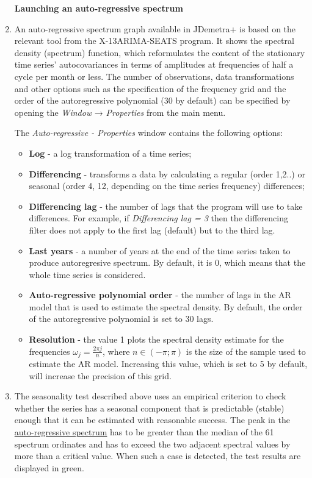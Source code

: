\documentclass[
  letterpaper,
  DIV=11,
  numbers=noendperiod]{scrreprt}
\begin{document}
\begin{enumerate}
\begin{figure}
  \end{figure}

  \textbf{Launching an auto-regressive spectrum}
\item
  An auto-regressive spectrum graph available in JDemetra+ is based on
  the relevant tool from the X-13ARIMA-SEATS program. It shows the
  spectral density (spectrum) function, which reformulates the content
  of the stationary time series' autocovariances in terms of amplitudes
  at frequencies of half a cycle per month or less. The number of
  observations, data transformations and other options such as the
  specification of the frequency grid and the order of the
  autoregressive polynomial (30 by default) can be specified by opening
  the \emph{Window} → \emph{Properties} from the main menu.

  The \emph{Auto-regressive - Properties} window contains the following
  options:

  \begin{itemize}
  \item
    \textbf{Log} - a log transformation of a time series;
  \item
    \textbf{Differencing} - transforms a data by calculating a regular
    (order 1,2..) or seasonal (order 4, 12, depending on the time series
    frequency) differences;
  \item
    \textbf{Differencing lag} - the number of lags that the program will
    use to take differences. For example, if \emph{Differencing lag = 3}
    then the differencing filter does not apply to the first lag
    (default) but to the third lag.
  \item
    \textbf{Last years} - a number of years at the end of the time
    series taken to produce autoregresive spectrum. By default, it is 0,
    which means that the whole time series is considered.
  \item
    \textbf{Auto-regressive polynomial order} - the number of lags in
    the AR model that is used to estimate the spectral density. By
    default, the order of the autoregressive polynomial is set to 30
    lags.
  \item
    \textbf{Resolution} - the value 1 plots the spectral density
    estimate for the frequencies \(\omega_{j} = \frac{2\pi j}{n}\),
    where \(n \in ( - \pi;\pi)\) is the size of the sample used to
    estimate the AR model. Increasing this value, which is set to 5 by
    default, will increase the precision of this grid.
  \end{itemize}
\item
  The seasonality test described above uses an empirical criterion to
  check whether the series has a seasonal component that is predictable
  (stable) enough that it can be estimated with reasonable success. The
  peak in the \href{../theory/spectral_AR.html}{auto-regressive
  spectrum} has to be greater than the median of the 61 spectrum
  ordinates and has to exceed the two adjacent spectral values by more
  than a critical value. When such a case is detected, the test results
  are displayed in green.


\end{enumerate}
\end{document}
